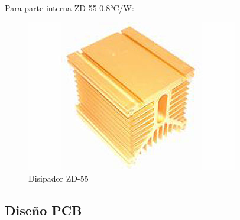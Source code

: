 \documentclass[a4paper,12pt,twoside]{article}
\begin{document}
Para parte interna ZD-55 0.8°C/W:

\begin{figure}[H]
    \centering
    \includegraphics[height=0.4\textwidth]{img/zd55.jpg}
    \caption{Disipador ZD-55}
    \label{fig:diszd55}
\end{figure}





















\newpage
\subsection{Diseño PCB}
\end{document}
